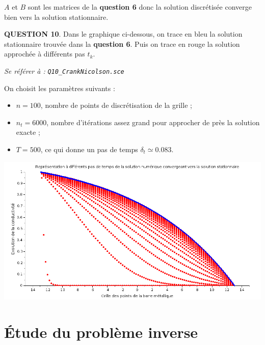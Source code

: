 \documentclass[a4paper,11pt]{article}
\newcommand{\quest}[1]{\small\textbf{#1}\normalsize}
\theoremstyle{nonumberplain}
\theoremstyle{nonumberplain}
\theoremstyle{nonumberplain}
\begin{document}
    $A$ et $B$ sont les matrices de la \textbf{question 6} donc la solution
    discrétisée converge bien vers la solution stationnaire.

    \newpage\quest{QUESTION 10}. Dans le graphique ci-dessous, on trace en bleu la solution
    stationnaire trouvée dans la \textbf{question 6}. Puis on trace en
    rouge la solution approchée à différents pas $t_k$.

    \begin{ref_scilab}
        \emph{Se référer à :} \texttt{\emph{Q10\_CrankNicolson.sce}}
    \end{ref_scilab}

    \smallskip
    On choisit les paramètres suivants :
    \begin{itemize}
        \item $n = 100$, nombre de points de discrétisation de la grille ;
        \item $n_t = 6000$, nombre d'itérations assez grand pour approcher de près la solution exacte ;
        \item $T = 500$, ce qui donne un pas de temps $\delta_t \simeq 0.083$.
    \end{itemize}

    \begin{center}
        \includegraphics[scale=0.5]{images/q10_approche2.png}
    \end{center}

\medskip
\section{\'{E}tude du problème inverse}
\end{document}
